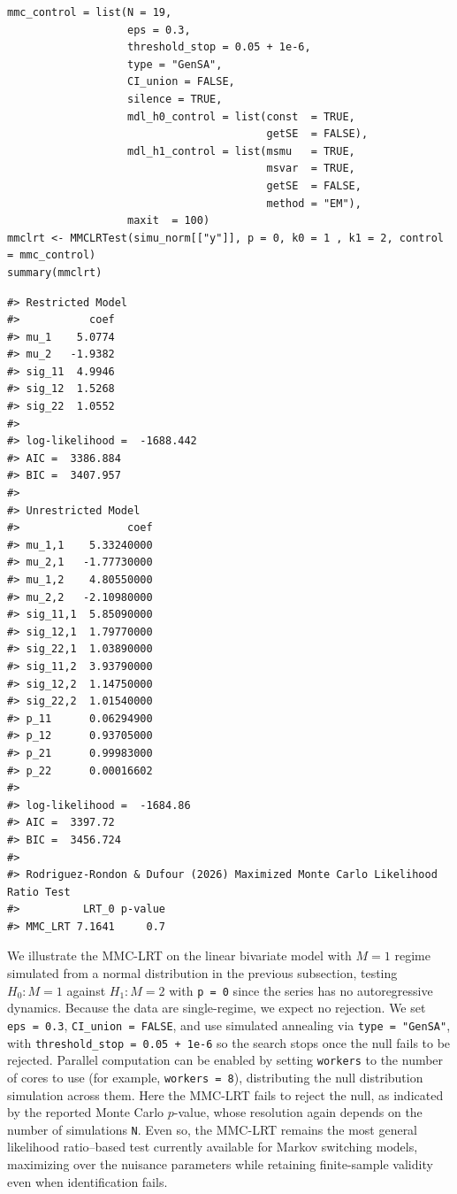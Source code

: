 \begin{verbatim}
mmc_control = list(N = 19,
                   eps = 0.3,
                   threshold_stop = 0.05 + 1e-6,
                   type = "GenSA",
                   CI_union = FALSE,
                   silence = TRUE,
                   mdl_h0_control = list(const  = TRUE,
                                         getSE  = FALSE),
                   mdl_h1_control = list(msmu   = TRUE,
                                         msvar  = TRUE,
                                         getSE  = FALSE,
                                         method = "EM"),
                   maxit  = 100)
mmclrt <- MMCLRTest(simu_norm[["y"]], p = 0, k0 = 1 , k1 = 2, control = mmc_control)
summary(mmclrt)
\end{verbatim}

\begin{verbatim}
#> Restricted Model
#>           coef
#> mu_1    5.0774
#> mu_2   -1.9382
#> sig_11  4.9946
#> sig_12  1.5268
#> sig_22  1.0552
#> 
#> log-likelihood =  -1688.442
#> AIC =  3386.884
#> BIC =  3407.957
#> 
#> Unrestricted Model
#>                 coef
#> mu_1,1    5.33240000
#> mu_2,1   -1.77730000
#> mu_1,2    4.80550000
#> mu_2,2   -2.10980000
#> sig_11,1  5.85090000
#> sig_12,1  1.79770000
#> sig_22,1  1.03890000
#> sig_11,2  3.93790000
#> sig_12,2  1.14750000
#> sig_22,2  1.01540000
#> p_11      0.06294900
#> p_12      0.93705000
#> p_21      0.99983000
#> p_22      0.00016602
#> 
#> log-likelihood =  -1684.86
#> AIC =  3397.72
#> BIC =  3456.724
#> 
#> Rodriguez-Rondon & Dufour (2026) Maximized Monte Carlo Likelihood Ratio Test
#>          LRT_0 p-value
#> MMC_LRT 7.1641     0.7
\end{verbatim}

We illustrate the MMC-LRT on the linear bivariate model with \(M = 1\) regime simulated from a normal distribution in the previous subsection, testing \(H_0: M = 1\) against \(H_1: M = 2\) with \texttt{p\ =\ 0} since the series has no autoregressive dynamics. Because the data are single-regime, we expect no rejection. We set \texttt{eps\ =\ 0.3}, \texttt{CI\_union\ =\ FALSE}, and use simulated annealing via \texttt{type\ =\ "GenSA"}, with \texttt{threshold\_stop\ =\ 0.05\ +\ 1e-6} so the search stops once the null fails to be rejected. Parallel computation can be enabled by setting \texttt{workers} to the number of cores to use (for example, \texttt{workers\ =\ 8}), distributing the null distribution simulation across them. Here the MMC-LRT fails to reject the null, as indicated by the reported Monte Carlo \(p\)-value, whose resolution again depends on the number of simulations \texttt{N}. Even so, the MMC-LRT remains the most general likelihood ratio--based test currently available for Markov switching models, maximizing over the nuisance parameters while retaining finite-sample validity even when identification fails.

